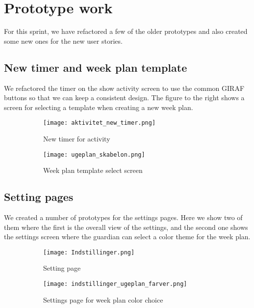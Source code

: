 \section{Prototype work}\label{sprint-3-prototypes}
For this sprint, we have refactored a few of the older prototypes and also created some new ones for the new user stories.

\subsection{New timer and week plan template}
We refactored the timer on the show activity screen to use the common GIRAF buttons so that we can keep a consistent design. The figure to the right shows a screen for selecting a template when creating a new week plan.
\begin{figure}[H]
    \begin{subfigure}{0.5\textwidth}
    \texttt{[image: aktivitet\_new\_timer.png]}
    \caption{New timer for activity}
    \label{fig:activity_new_timer}
    \end{subfigure}
    \begin{subfigure}{0.5\textwidth}
        \texttt{[image: ugeplan\_skabelon.png]}
    \caption{Week plan template select screen}
    \label{fig:weekplan_template_screen}
    \end{subfigure} 
    \caption{}
    \label{activity_new_timer_and_weekplan_template_screen}
\end{figure}

\subsection{Setting pages}
We created a number of prototypes for the settings pages. Here we show two of them where the first is the overall view of the settings, and the second one shows the settings screen where the guardian can select a color theme for the week plan.
\begin{figure}[H]
    \begin{subfigure}{0.5\textwidth}
    \texttt{[image: Indstillinger.png]} 
    \caption{Setting page}
    \label{fig:settings}
    \end{subfigure}
    \begin{subfigure}{0.5\textwidth}
        \texttt{[image: indstillinger\_ugeplan\_farver.png]}
    \caption{Settings page for week plan color choice}
    \label{fig:settings_color_choice}
    \end{subfigure}
    \caption{} 
    \label{settings_and_settings_color_choice}
\end{figure}

